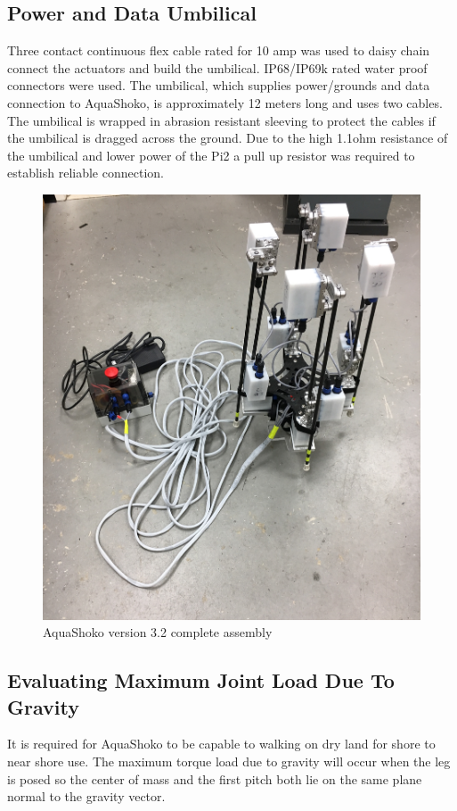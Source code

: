 \subsection{Power and Data Umbilical}
Three contact continuous flex cable rated for 10 amp was used to daisy chain connect the actuators and build the umbilical. IP68/IP69k rated water proof connectors were used.
The umbilical, which supplies power/grounds and data connection to AquaShoko, is approximately 12 meters long and uses two cables. The umbilical is wrapped in abrasion resistant sleeving to protect the cables if the umbilical is dragged across the ground. Due to the high 1.1ohm resistance of the umbilical and lower power of the Pi2 a pull up resistor was required to establish reliable connection. 

\begin{figure}[h]
\centering
\includegraphics[width=1.0\columnwidth]{./img/aquaShoko-v3dot2-photo-complete.JPG}
\caption{AquaShoko version 3.2 complete assembly }
\label{fig:shoko 3dot2}
\end{figure}

\subsection{Evaluating Maximum Joint Load Due To Gravity}
It is required for AquaShoko to be capable to walking on dry land for shore to near shore use. The maximum torque load due to gravity will occur when the leg is posed so the center of mass and the first pitch both lie on the same plane normal to the gravity vector. 


